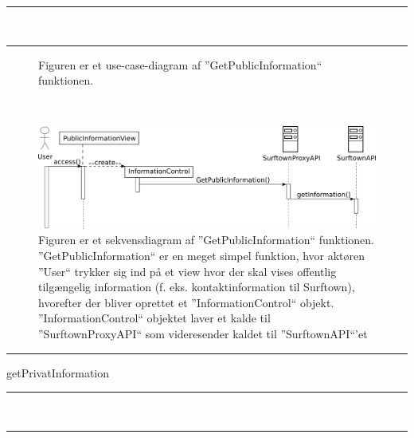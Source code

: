 \documentclass[12pt]{article}
\begin{document}
	\rule{430pt}{0.4pt}
	\\
	\rule{430pt}{0.4pt}
\vspace{-30pt}
\begin{figure}[!h]
	\caption{Figuren er et use-case-diagram af ''GetPublicInformation`` funktionen.}
	\label{GetPublicInformationUseCase}
\end{figure}\\
\begin{figure}[!h]
	\centering
	\includegraphics[width=13cm]{sekvens_diagrammer/GetPublicInformation.png}
	\caption{Figuren er et sekvensdiagram af ''GetPublicInformation`` funktionen. ''GetPublicInformation`` er en meget simpel funktion, hvor aktøren ''User`` trykker sig ind på et view hvor der skal vises offentlig tilgængelig information (f. eks. kontaktinformation til Surftown), hvorefter der bliver oprettet et ''InformationControl`` objekt. ''InformationControl`` objektet laver et kalde til ''SurftownProxyAPI`` som videresender kaldet til ''SurftownAPI``'et}
	\label{fig:GetPublicInformation}
\end{figure}
\newpage
	\hspace{-20pt}
	\rule{430pt}{1.0pt}
	 getPrivatInformation\\
	\rule{430pt}{0.4pt}
	\\
	\rule{430pt}{0.4pt}
	\\
\end{document}
